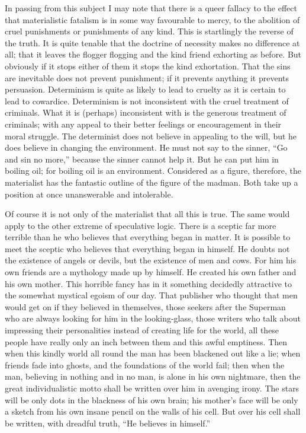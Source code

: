 In passing from this subject I may note that there is a queer fallacy to the effect that materialistic fatalism is in some way favourable to mercy, to the abolition of cruel punishments or punishments of any kind. This is startlingly the reverse of the truth. It is quite tenable that the doctrine of necessity makes no difference at all; that it leaves the flogger flogging and the kind friend exhorting as before. But obviously if it stops either of them it stops the kind exhortation. That the sins are inevitable does not prevent punishment; if it prevents anything it prevents persuasion. Determinism is quite as likely to lead to cruelty as it is certain to lead to cowardice. Determinism is not inconsistent with the cruel treatment of criminals. What it is (perhaps) inconsistent with is the generous treatment of criminals; with any appeal to their better feelings or encouragement in their moral struggle. The determinist does not believe in appealing to the will, but he does believe in changing the environment. He must not say to the sinner, “Go and sin no more,” because the sinner cannot help it. But he can put him in boiling oil; for boiling oil is an environment. Considered as a figure, therefore, the materialist has the fantastic outline of the figure of the madman. Both take up a position at once unanswerable and intolerable.

Of course it is not only of the materialist that all this is true. The same would apply to the other extreme of speculative logic. There is a sceptic far more terrible than he who believes that everything began in matter. It is possible to meet the sceptic who believes that everything began in himself. He doubts not the existence of angels or devils, but the existence of men and cows. For him his own friends are a mythology made up by himself. He created his own father and his own mother. This horrible fancy has in it something decidedly attractive to the somewhat mystical egoism of our day. That publisher who thought that men would get on if they believed in themselves, those seekers after the Superman who are always looking for him in the looking-glass, those writers who talk about impressing their personalities instead of creating life for the world, all these people have really only an inch between them and this awful emptiness. Then when this kindly world all round the man has been blackened out like a lie; when friends fade into ghosts, and the foundations of the world fail; then when the man, believing in nothing and in no man, is alone in his own nightmare, then the great individualistic motto shall be written over him in avenging irony. The stars will be only dots in the blackness of his own brain; his mother’s face will be only a sketch from his own insane pencil on the walls of his cell. But over his cell shall be written, with dreadful truth, “He believes in himself.”

